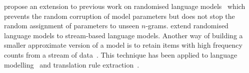 
\citet{guthrie-hepple:2010:EMNLP} propose an extension to previous work
on randomised language models~\citep{talbot-osborne:2007:EMNLP-CoNLL} which prevents
the random corruption of model parameters but does not stop the random
assignment of parameters to unseen $n$-grams.
\citet{levenberg-osborne:2009:EMNLP} extend randomised language models to
stream-based language models. Another way of building a smaller approximate
version of a model is to retain items with high frequency counts from a stream
of data~\citep{manku-motwani:2002:VLDB}. This technique has been applied to
language modelling~\citep{goyal-daumeiii-venkatasubramanian:2009:NAACL} and
translation rule extraction~\citep{przywara-bojar:2011:PBML}. 




